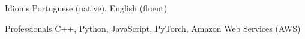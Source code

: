 
\begin{cvskills}
	\cvskill
	{Idioms}
	{Portuguese (native), English (fluent)}

	\cvskill
	{Professionals}
	{C++, Python, JavaScript, PyTorch, Amazon Web Services (AWS)}

\end{cvskills}

